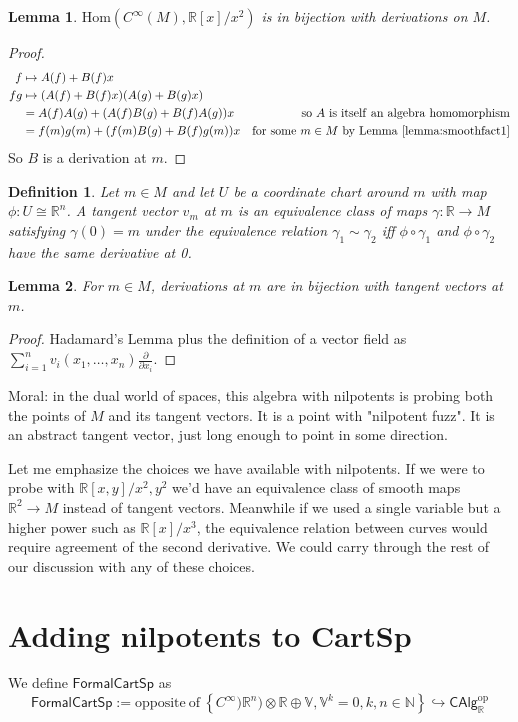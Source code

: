 \documentclass[12pt]{article}
\newcommand{\Hom}{\mathrm{Hom}}
\newcommand{\rr}{\ensuremath{\mathbb{R}}}
\newcommand{\nn}{\ensuremath{\mathbb{N}}}
\newcommand{\cinfty}{\ensuremath{C^{\infty}}}
\newcommand{\calg}{\textsf{CAlg}_{\rr}}
\newcommand{\cart}{\textsf{CartSp}}
\newcommand{\formalcart}{\textsf{FormalCartSp}}
\newtheorem{mydef}{Definition}
\newtheorem{mylemma}{Lemma}
\begin{document}
\begin{mylemma}\label{lemma:tangent}$\Hom(\cinfty(M),\rr[x]/x^2)$ is in bijection with derivations on $M$.
\end{mylemma}
\begin{proof}
\begin{align*}
f &\mapsto A(f) + B(f)x \\
fg &\mapsto (A(f) + B(f)x)(A(g)+B(g)x)&\quad \\
&= A(f)A(g) + (A(f)B(g) + B(f)A(g))x &\mathrm{so\ } A \mathrm{\ is\ itself\ an\ algebra\ homomorphism} \\
&= f(m)g(m) + (f(m)B(g) + B(f)g(m))x &\mathrm{for\ some\ } m\in M\mathrm{\ by\ Lemma~\ref{lemma:smoothfact1}}
\end{align*}
So $B$ is a derivation at $m$.
\end{proof}
\begin{mydef}Let $m\in M$ and let $U$ be a coordinate chart around $m$ with map $\phi:U\cong\rr^n$. A tangent vector $v_m$ at $m$ is an equivalence class of maps $\gamma:\rr\to M$ satisfying $\gamma(0)=m$ under the equivalence relation $\gamma_1\sim\gamma_2$ iff $\phi\circ\gamma_1$ and $\phi\circ\gamma_2$ have the same derivative at 0.\end{mydef}

\begin{mylemma}\label{lemma:derivationsaretangentvectors}For $m\in M$, derivations at $m$ are in bijection with tangent vectors at $m$.\end{mylemma}
\begin{proof}Hadamard's Lemma plus the definition of a vector field as $\sum_{i=1}^n v_i(x_1,\ldots,x_n)\frac{\partial}{\partial x_i}$.\end{proof}

Moral: in the dual world of spaces, this algebra with nilpotents is probing both the points of $M$ and its tangent vectors. It is a point with "nilpotent fuzz". It is an abstract tangent vector, just long enough to point in some direction.

Let me emphasize the choices we have available with nilpotents. If we were to probe with $\rr[x,y]/x^2,y^2$ we'd have an equivalence class of smooth maps $\rr^2\to M$ instead of tangent vectors. Meanwhile if we used a single variable but a higher power such as $\rr[x]/x^3$, the equivalence relation between curves would require agreement of the second derivative. We could carry through the rest of our discussion with any of these choices.

\section{Adding nilpotents to \cart}\label{sec:nilpotentstocartsp}
We define $\formalcart$ as $$\formalcart := \mathrm{opposite\ of\ }\left\{\cinfty)\rr^n)\otimes\rr\oplus\mathbb{V}, \mathbb{V}^k=0, k,n\in\nn\right\}\hookrightarrow \calg^{\mathrm{op}}$$
\end{document}
